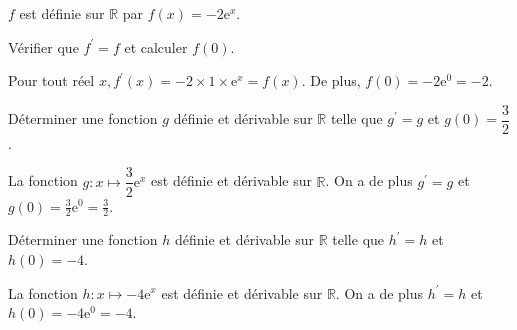 \documentclass[11pt,a4paper]{article}  %
\begin{document}
	\graphicspath{{img_oblig/}}
	
	\begin{center}
		
		
	\end{center}


$f$ est définie sur $\mathbb{R}$ par $f(x)=-2 \mathrm{e}^x$.

Vérifier que $f^{\prime}=f$ et calculer $f(0)$.

\begin{corrBox}
	Pour tout réel $x, f^{\prime}(x)=-2 \times 1 \times \mathrm{e}^x=f(x)$. De plus, $f(0)=-2 \mathrm{e}^0=-2$.	
\end{corrBox}



Déterminer une fonction $g$ définie et dérivable sur $\mathbb{R}$ telle que $g^{\prime}=g$ et $g(0)=\dfrac{3}{2}$.

\begin{corrBox}
	La fonction $g: x \mapsto \dfrac{3}{2} \mathrm{e}^x$ est définie et dérivable sur $\mathbb{R}$. On a de plus $g^{\prime}=g$ et $g(0)=\frac{3}{2} \mathrm{e}^0=\frac{3}{2}$.	
\end{corrBox}



Déterminer une fonction $h$ définie et dérivable sur $\mathbb{R}$ telle que $h^{\prime}=h$ et $h(0)=-4$.

\begin{corrBox}
	La fonction $h: x \mapsto-4 \mathrm{e}^x$ est définie et dérivable sur $\mathbb{R}$. On a de plus $h^{\prime}=h$ et $h(0)=-4 \mathrm{e}^0=-4$.	
\end{corrBox}


\end{document}
